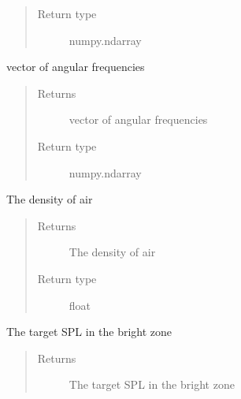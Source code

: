 \documentclass[letterpaper,10pt,english]{sphinxmanual}
\begin{document}
\begin{fulllineitems}
\begin{fulllineitems}
\begin{quote}
\begin{description}
\item[{Return type}] \leavevmode
numpy.ndarray

\end{description}\end{quote}

\end{fulllineitems}


\begin{fulllineitems}
\label{\detokenize{source/pyzones:pyzones.Simulation.omega}}
vector of angular frequencies
\begin{quote}\begin{description}
\item[{Returns}] \leavevmode
vector of angular frequencies

\item[{Return type}] \leavevmode
numpy.ndarray

\end{description}\end{quote}

\end{fulllineitems}


\begin{fulllineitems}
\label{\detokenize{source/pyzones:pyzones.Simulation.rho}}
The density of air
\begin{quote}\begin{description}
\item[{Returns}] \leavevmode
The density of air

\item[{Return type}] \leavevmode
float

\end{description}\end{quote}

\end{fulllineitems}


\begin{fulllineitems}
\label{\detokenize{source/pyzones:pyzones.Simulation.target_spl}}
The target SPL in the bright zone
\begin{quote}\begin{description}
\item[{Returns}] \leavevmode
The target SPL in the bright zone


\end{description}
\end{quote}
\end{fulllineitems}
\end{fulllineitems}
\end{document}
